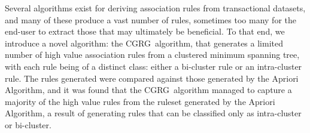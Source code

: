 \documentclass[paper=a4,fontsize=11pt]{report}	%
\newcommand{\algo}{CGRG}
\begin{document}
Several algorithms exist for deriving association rules from transactional datasets, and many of these produce a vast number of rules, sometimes too many for the end-user to extract those that may ultimately be beneficial.
To that end, we introduce a novel algorithm: the \algo\ algorithm, that generates a limited number of high value association rules from a clustered minimum spanning tree, with each rule being of a distinct class: either a bi-cluster rule or an intra-cluster rule. The rules generated were compared against those generated by the Apriori Algorithm, and it was found that the \algo\ algorithm managed to capture a majority of the high value rules from the ruleset generated by the Apriori Algorithm, a result of generating rules that can be classified only as intra-cluster or bi-cluster.

\newpage\tableofcontents\newpage

\setcounter{page}{1}		%

\pagestyle{fancy}
\fancyhf{}
\lhead{\leftmark}



\renewcommand*{\mkbibnamefamily}[1]{\textsc{\textbf{#1}}}
\renewcommand*{\mkbibnameprefix}[1]{\textsc{\textbf{#1}}}
\renewcommand*{\mkbibnamegiven}[1]{\textsc{\textbf{#1}}}
\renewcommand*{\mkbibnamesuffix}[1]{\textsc{\textbf{#1}}}
\printbibliography[heading=bibintoc, title=References]

\end{document}
